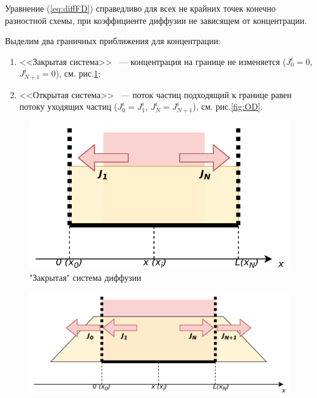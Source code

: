 Уравнение (\ref{eq:diffFD}) справедливо для всех не крайних точек конечно разностной схемы, при коэффициенте диффузии не зависящем от концентрации.

Выделим два граничных приближения для концентрации:
\begin{enumerate}
	\item <<Закрытая система>> ~--- концентрация на границе не изменяется ($J_{0}^{i} = 0$, $J_{N+1}^{i} = 0$), см. рис.\ref{fig:CD};
	\item <<Открытая система>> ~--- поток частиц подходящий к границе равен потоку уходящих частиц ($J_{0}^{i} = J_{1}^{i}$, $J_{N}^{i} = J_{N+1}^{i}$), см. рис.\ref{fig:OD}.
\end{enumerate}

\begin{figure}
	\centering
	\includegraphics[width=0.9\linewidth]{assets/CD}
	\caption{"Закрытая" система диффузии}
	\label{fig:CD}
\end{figure}

\begin{figure}
	\centering
	\includegraphics[width=0.9\linewidth]{assets/OD}
	\label{fig:OD"}
\end{figure}

